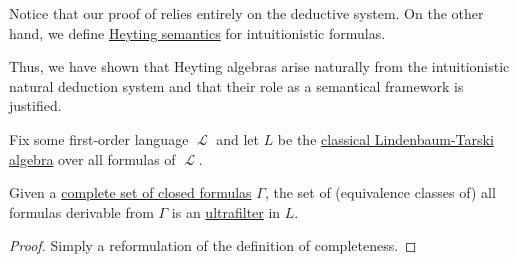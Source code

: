 \begin{remark}\label{rem:thm:intuitionistic_lindenbaum_tarski_algebra/syntactic_proof}
  Notice that our proof of  relies entirely on the deductive system. On the other hand, we define \hyperref[def:propositional_heyting_algebra_semantics]{Heyting semantics} for intuitionistic formulas.

  Thus, we have shown that Heyting algebras arise naturally from the intuitionistic natural deduction system and that their role as a semantical framework is justified.
\end{remark}

\begin{proposition}\label{thm:filters_intuitionistic_lindenbaum_tarski_algebra}
  Fix some first-order language \( \mscrL \) and let \( L \) be the \hyperref[thm:filters_intuitionistic_lindenbaum_tarski_algebra]{classical Lindenbaum-Tarski algebra} over all formulas of \( \mscrL \).

  Given a \hyperref[def:first_order_theory/complete]{complete set of closed formulas} \( \Gamma \), the set of (equivalence classes of) all formulas derivable from \( \Gamma \) is an \hyperref[def:ultrafilter]{ultrafilter} in \( L \).
\end{proposition}
\begin{proof}
  Simply a reformulation of the definition of completeness.
\end{proof}
